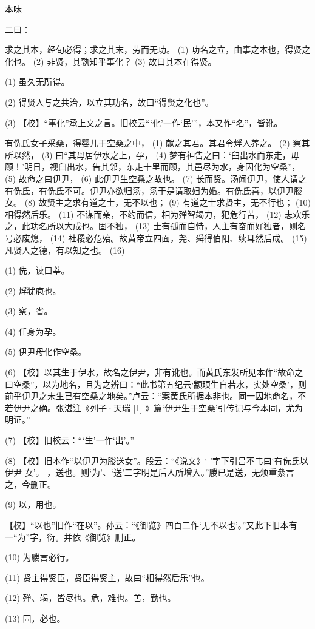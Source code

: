 \documentclass[12pt,UTF8]{ctexbook}
\begin{document}
本味


二曰：

求之其本，经旬必得；求之其末，劳而无功。 (1) 功名之立，由事之本也，得贤之化也。 (2) 非贤，其孰知乎事化？ (3) 故曰其本在得贤。

(1) 虽久无所得。

(2) 得贤人与之共治，以立其功名，故曰“得贤之化也”。

(3) 【校】“事化”承上文之言。旧校云“‘化’一作‘民’”，本又作“名”，皆讹。

有侁氏女子采桑，得婴儿于空桑之中， (1) 献之其君。其君令烰人养之。 (2) 察其所以然， (3) 曰“其母居伊水之上，孕， (4) 梦有神告之曰：‘臼出水而东走，毋顾！’明日，视臼出水，告其邻，东走十里而顾，其邑尽为水，身因化为空桑”， (5) 故命之曰伊尹， (6) 此伊尹生空桑之故也。 (7) 长而贤。汤闻伊尹，使人请之有侁氏，有侁氏不可。伊尹亦欲归汤，汤于是请取妇为婚。有侁氏喜，以伊尹媵女。 (8) 故贤主之求有道之士，无不以也； (9) 有道之士求贤主，无不行也； (10) 相得然后乐。 (11) 不谋而亲，不约而信，相为殚智竭力，犯危行苦， (12) 志欢乐之，此功名所以大成也。固不独， (13) 士有孤而自恃，人主有奋而好独者，则名号必废熄， (14) 社稷必危殆。故黄帝立四面，尧、舜得伯阳、续耳然后成。 (15) 凡贤人之德，有以知之也。 (16)

(1) 侁，读曰莘。

(2) 烰犹庖也。

(3) 察，省。

(4) 任身为孕。

(5) 伊尹母化作空桑。

(6) 【校】以其生于伊水，故名之伊尹，非有讹也。而黄氏东发所见本作“故命之曰空桑”，以为地名，且为之辨曰：“此书第五纪云‘颛顼生自若水，实处空桑’，则前乎伊尹之未生已有空桑之地矣。”卢云：“案黄氏所据本非也。同一因地命名，不若伊尹之确。张湛注《列子·天瑞 [1] 》篇‘伊尹生于空桑’引传记与今本同，尤为明证。”

(7) 【校】旧校云：“‘生’一作‘出’。”

(8) 【校】旧本作“以伊尹为媵送女”。段云：“《说文》‘ ’字下引吕不韦曰‘有侁氏以伊尹 女’。 ，送也。则‘为’、‘送’二字明是后人所增入。”媵已是送，无烦重絫言之，今删正。

(9) 以，用也。

【校】“以也”旧作“在以”。孙云：“《御览》四百二作‘无不以也’。”又此下旧本有一“为”字，衍。并依《御览》删正。

(10) 为媵言必行。

(11) 贤主得贤臣，贤臣得贤主，故曰“相得然后乐”也。

(12) 殚、竭，皆尽也。危，难也。苦，勤也。

(13) 固，必也。
\end{document}
